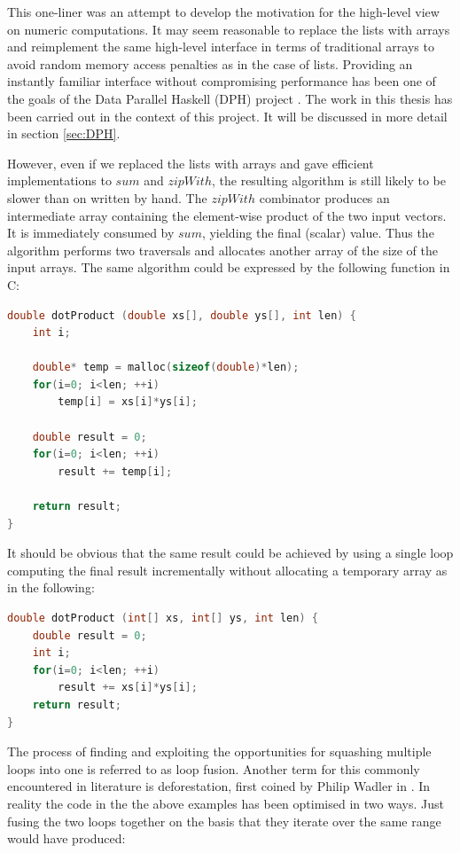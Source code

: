 \documentclass[preamble.tex]{subfiles}
\begin{document}
This one-liner was an attempt to develop the motivation for the high-level view on numeric computations. It may seem reasonable to replace the lists with arrays and reimplement the same high-level interface in terms of traditional arrays to avoid random memory access penalties as in the case of lists. Providing an instantly familiar interface without compromising performance has been one of the goals of the Data Parallel Haskell (DPH) project \cite{PLKC08,CLP+07}. The work in this thesis has been carried out in the context of this project. It will be discussed in more detail in section \ref{sec:DPH}.

However, even if we replaced the lists with arrays and gave efficient implementations to $sum$ and $zipWith$, the resulting algorithm is still likely to be slower than on written by hand. The $zipWith$ combinator produces an intermediate array containing the element-wise product of the two input vectors. It is immediately consumed by $sum$, yielding the final (scalar) value. Thus the algorithm performs two traversals and allocates another array of the size of the input arrays. The same algorithm could be expressed by the following function in C:

\begin{lstlisting}[basicstyle={\ttfamily},language=C,tabsize=4]
double dotProduct (double xs[], double ys[], int len) {
	int i;

	double* temp = malloc(sizeof(double)*len);
	for(i=0; i<len; ++i)
		temp[i] = xs[i]*ys[i];

	double result = 0;
	for(i=0; i<len; ++i)
		result += temp[i];

	return result;
}
\end{lstlisting}


It should be obvious that the same result could be achieved by using a single loop computing the final result incrementally without allocating a temporary array as in the following:

\begin{lstlisting}[basicstyle={\ttfamily},language=C,tabsize=4]
double dotProduct (int[] xs, int[] ys, int len) {
	double result = 0;
	int i;
	for(i=0; i<len; ++i)
		result += xs[i]*ys[i];
	return result;
}
\end{lstlisting}


The process of finding and exploiting the opportunities for squashing multiple loops into one is referred to as loop fusion. Another term for this commonly encountered in literature is deforestation, first coined by Philip Wadler in \cite{Wad90}. In reality the code in the the above examples has been optimised in two ways. Just fusing the two loops together on the basis that they iterate over the same range would have produced:
\end{document}
